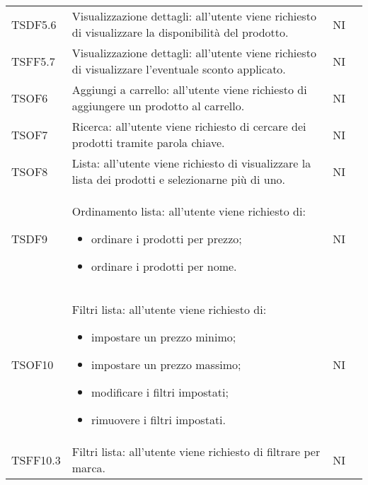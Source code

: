 \begin{center}
\begin{longtable}[!h]{p{50px} p{245px} p{75px} p{50px}}
        TSDF5.6                          & Visualizzazione dettagli: all'utente viene richiesto di visualizzare la disponibilità del prodotto.                                                                 & NI             \\
        TSFF5.7                          & Visualizzazione dettagli: all'utente viene richiesto di visualizzare l'eventuale sconto applicato.                                                                  & NI             \\
        TSOF6                            & Aggiungi a carrello: all'utente viene richiesto di aggiungere un prodotto al carrello.                                                                              & NI             \\
        TSOF7                            & Ricerca: all'utente viene richiesto di cercare dei prodotti tramite parola chiave.                                                                                  & NI             \\
        TSOF8                            & Lista: all'utente viene richiesto di visualizzare la lista dei prodotti e selezionarne pi\`u di uno.                                                                & NI             \\
        TSDF9                            & Ordinamento lista: all'utente viene richiesto di: \begin{itemize} \item ordinare i prodotti per prezzo; \item ordinare i prodotti per nome. \end{itemize}                                                                                         & NI             \\
        TSOF10                           & Filtri lista: all'utente viene richiesto di: \begin{itemize} \item impostare un prezzo minimo; \item impostare un prezzo massimo; \item modificare i filtri impostati; \item rimuovere i filtri impostati. \end{itemize}                                                                                             & NI             \\
        TSFF10.3                         & Filtri lista: all'utente viene richiesto di filtrare per marca.                                                                                                     & NI             \\

\end{longtable}
\end{center}
